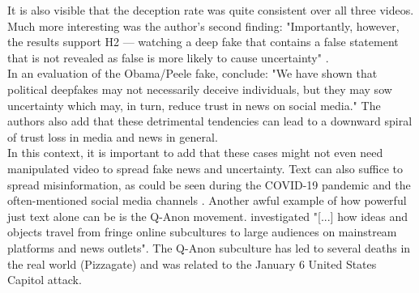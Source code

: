 \documentclass[
  a4paper,  %
  twoside,  %
  bibliography=totoc,
  headsepline,
  cleardoublepage=empty,
  parskip=half,
  draft=false
]{scrbook}
\begin{document}
It is also visible that the deception rate was quite consistent over all three videos. Much more interesting was the author's second finding: "Importantly, however, the results support H2 — watching a deep fake that contains a false statement that is not revealed as false is more likely to cause uncertainty" \cite{vaccariDeepfakesDisinformationExploring2020}. \\
In an evaluation of the Obama/Peele fake, \citet{vaccariDeepfakesDisinformationExploring2020} conclude: "We have shown that political deepfakes may not necessarily deceive individuals, but they may sow uncertainty which may, in turn, reduce trust in news on social media." The authors also add that these detrimental tendencies can lead to a downward spiral of trust loss in media and news in general. \\
In this context, it is important to add that these cases might not even need manipulated video to spread fake news and uncertainty. Text can also suffice to spread misinformation, as could be seen during the COVID-19 pandemic and the often-mentioned social media channels \cite{naeemExplorationHowFake2021}. Another awful example of how powerful just text alone can be is the Q-Anon movement. \citet{zeeuwTracingNormieficationCrossplatform2020} investigated "[...] how ideas and objects travel from fringe online subcultures to large audiences on mainstream platforms and news outlets". The Q-Anon subculture has led to several deaths in the real world (Pizzagate) and was related to the January 6 United States Capitol attack.
\end{document}
